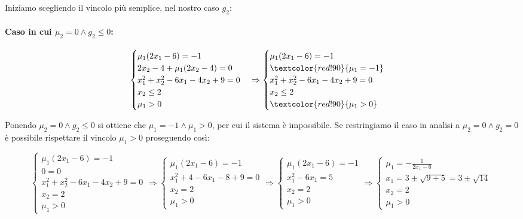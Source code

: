 \documentclass[\main/main.tex]{subfiles}
\begin{document}
Iniziamo scegliendo il vincolo più semplice, nel nostro caso $g_2$:

\paragraph*{Caso in cui $\mu_2 = 0 \land g_2 \leq 0$:}
\[
	\begin{cases}
		\mu_1(2x_1 - 6) = -1          \\
		2x_2 -4 + \mu_1(2x_2 - 4) = 0 \\
		x^2_1+x^2_2-6x_1-4x_2+9 = 0   \\
		x_2 \leq 2                    \\
		\mu_1 > 0
	\end{cases}
	\Rightarrow
	\begin{cases}
		\mu_1(2x_1 - 6) = -1           \\
		\textcolor{red!90}{\mu_1 = -1} \\
		x^2_1+x^2_2-6x_1-4x_2+9 = 0    \\
		x_2 \leq 2                     \\
		\textcolor{red!90}{\mu_1 > 0}
	\end{cases}
\]

Ponendo $\mu_2 = 0 \land g_2 \leq 0$ si ottiene che $\mu_1 = -1 \land \mu_1 > 0$, per cui il sistema è impossibile. Se restringiamo il caso in analisi a $\mu_2 = 0 \land g_2 = 0$ è possibile rispettare il vincolo $\mu_1 > 0$ proseguendo così:

\[
	\begin{cases}
		\mu_1(2x_1 - 6) = -1        \\
		0 = 0                       \\
		x^2_1+x^2_2-6x_1-4x_2+9 = 0 \\
		x_2 = 2                     \\
		\mu_1 > 0
	\end{cases}
	\Rightarrow
	\begin{cases}
		\mu_1(2x_1 - 6) = -1 \\
		x^2_1+4-6x_1-8+9 = 0 \\
		x_2 = 2              \\
		\mu_1 > 0
	\end{cases}
	\Rightarrow
	\begin{cases}
		\mu_1(2x_1 - 6) = -1 \\
		x^2_1-6x_1 = 5       \\
		x_2 = 2              \\
		\mu_1 > 0
	\end{cases}
	\Rightarrow
	\begin{cases}
		\mu_1 = -\frac{1}{2x_1 - 6}                \\
		x_1 = 3 \pm \sqrt{9 + 5} = 3 \pm \sqrt{14} \\
		x_2 = 2                                    \\
		\mu_1 > 0
	\end{cases}
\]
\end{document}
